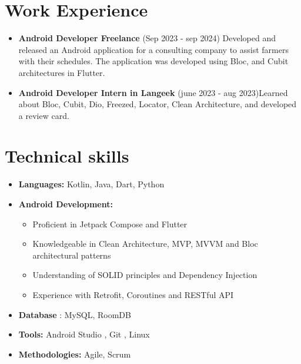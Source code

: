 \documentclass[a4paper,12pt]{article} %
\begin{document}
\vspace{0.5cm}

\section{Work Experience}
\vspace{0.2cm}

\begin{itemize}
    \item \textbf{Android Developer Freelance } (Sep 2023 - sep 2024) \newline
    Developed and released an Android application for a consulting company to assist farmers with their schedules. The application was developed using Bloc, and Cubit architectures in Flutter. 
    \vspace{0.5cm}
    \item \textbf{Android Developer Intern in Langeek} (june 2023 - aug 2023)\newline Learned about Bloc, Cubit, Dio, Freezed, Locator, Clean Architecture, and developed a review card.
\end{itemize}

\vspace{0.5cm}

\section{Technical skills} 

\begin{itemize}
    \item \textbf{Languages: }Kotlin, Java, Dart, Python
    \vspace{0.2cm}
    \item \textbf{Android Development:} 
        \begin{itemize}
            \vspace{0.1cm}
            \item Proficient in Jetpack Compose and Flutter
            \vspace{0.1cm}
            \item Knowledgeable in Clean Architecture, MVP, MVVM and Bloc architectural patterns
            \item Understanding of SOLID principles and Dependency Injection
            \vspace{0.1cm}
            \item Experience with Retrofit, Coroutines and RESTful API 
            \vspace{0.1cm}
        \end{itemize}
        \vspace{0.2cm}
    \item \textbf{Database} : MySQL, RoomDB
    \vspace{0.2cm}
    \item \textbf{Tools: }Android Studio , Git , Linux
    \vspace{0.2cm}
    \item \textbf{Methodologies: }Agile, Scrum
\end{itemize}
\vspace{0.5cm}
\end{document}
